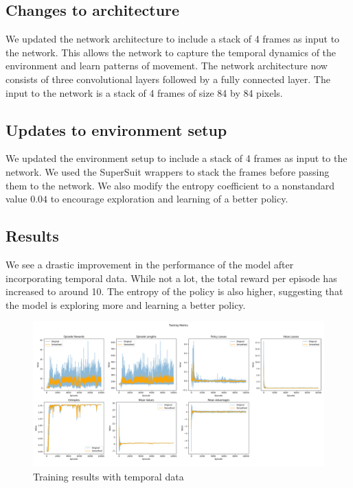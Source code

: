 \documentclass{article}
\begin{document}
\subsection{Changes to architecture}
We updated the network architecture to include a stack of 4 frames as input to the network. This allows the network to capture the temporal dynamics of the environment
and learn patterns of movement. The network architecture now consists of three convolutional layers followed by a fully connected layer. The input to the network is a stack of 4 frames
of size 84 by 84 pixels.

\subsection{Updates to environment setup}
We updated the environment setup to include a stack of 4 frames as input to the network. We used the SuperSuit wrappers to stack the frames before passing them to the network. We also modify
the entropy coefficient to a nonstandard value $0.04$ to encourage exploration and learning of a better policy.

\subsection{Results}
We see a drastic improvement in the performance of the model after incorporating temporal data. 
While not a lot, the total reward per episode has increased to around 10. The entropy of the policy is also higher, suggesting that the model is exploring more and learning a better policy.

\begin{figure}[h]
  \centering
  \includegraphics[scale=0.3]{run12.png}
  \caption{Training results with temporal data}
  \label{fig:training_results_with_temporal}
\end{figure}
\end{document}
